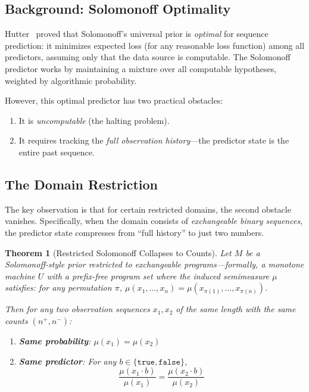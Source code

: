 \documentclass[]{article}
\newtheorem{theorem}{Theorem}
\begin{document}
\subsection{Background: Solomonoff Optimality}

Hutter~\cite{hutter2003optimality} proved that Solomonoff's universal
prior is \emph{optimal} for sequence prediction: it minimizes expected
loss (for any reasonable loss function) among all predictors, assuming
only that the data source is computable.  The Solomonoff predictor
works by maintaining a mixture over all computable hypotheses,
weighted by algorithmic probability.

However, this optimal predictor has two practical obstacles:
\begin{enumerate}
\item It is \emph{uncomputable} (the halting problem).
\item It requires tracking the \emph{full observation history}---the
  predictor state is the entire past sequence.
\end{enumerate}

\subsection{The Domain Restriction}

The key observation is that for certain restricted domains, the second
obstacle vanishes.  Specifically, when the domain consists of
\emph{exchangeable binary sequences}, the predictor state compresses
from ``full history'' to just two numbers.

\begin{theorem}[Restricted Solomonoff Collapses to Counts]
\label{thm:pln_optimal}
Let $M$ be a Solomonoff-style prior \emph{restricted to exchangeable
programs}---formally, a monotone machine $U$ with a prefix-free
program set where the induced semimeasure $\mu$ satisfies: for any
permutation $\pi$, $\mu(x_1, \ldots, x_n) = \mu(x_{\pi(1)}, \ldots,
x_{\pi(n)})$.

Then for any two observation sequences $x_1, x_2$ of the same length
with the same counts $(n^+, n^-)$:
\begin{enumerate}
\item \textbf{Same probability}: $\mu(x_1) = \mu(x_2)$
\item \textbf{Same predictor}: For any $b \in \{\texttt{true}, \texttt{false}\}$,
  $$\frac{\mu(x_1 \cdot b)}{\mu(x_1)} = \frac{\mu(x_2 \cdot b)}{\mu(x_2)}$$
\end{enumerate}
\end{theorem}
\end{document}
